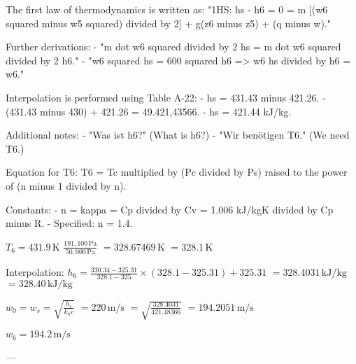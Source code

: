 The first law of thermodynamics is written as:  
"1HS: hs - h6 = 0 = m [(w6 squared minus w5 squared) divided by 2] + g(z6 minus z5) + (q minus w)."  

Further derivations:  
- "m dot w6 squared divided by 2 hs = m dot w6 squared divided by 2 h6."  
- "w6 squared hs = 600 squared h6 => w6 hs divided by h6 = w6."  

Interpolation is performed using Table A-22:  
- hs = 431.43 minus 421.26.  
- (431.43 minus 430) + 421.26 = 49.421,43566.  
- hs = 421.44 kJ/kg.  

Additional notes:  
- "Was ist h6?" (What is h6?)  
- "Wir benötigen T6." (We need T6.)  

Equation for T6:  
T6 = Tc multiplied by (Pc divided by Ps) raised to the power of (n minus 1 divided by n).  

Constants:  
- n = kappa = Cp divided by Cv = 1.006 kJ/kgK divided by Cp minus R.  
- Specified: n = 1.4.

\( T_6 = 431.9 \, \text{K} \)  
\( \frac{191,100 \, \text{Pa}}{50,000 \, \text{Pa}} \)  
\( = 328.67469 \, \text{K} \)  
\( = 328.1 \, \text{K} \)  

Interpolation:  
\( h_6 = \frac{330.34 - 325.31}{328.1 - 325} \times (328.1 - 325.31) + 325.31 \)  
\( = 328.4031 \, \text{kJ/kg} \)  
\( = 328.40 \, \text{kJ/kg} \)  

\( w_0 = w_s = \sqrt{\frac{h_s}{k_hc}} \)  
\( = 220 \, \text{m/s} \)  
\( = \sqrt{\frac{328.4031}{421.48366}} \)  
\( = 194.2051 \, \text{m/s} \)  

\( w_6 = 194.2 \, \text{m/s} \)  

---